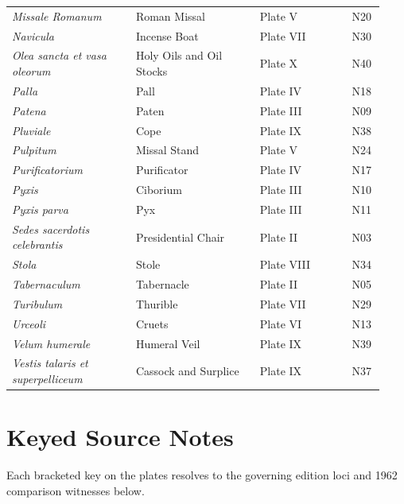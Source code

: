 {\begin{longtable}{>{\raggedright\arraybackslash}p{0.31\linewidth}>{\raggedright\arraybackslash}p{0.31\linewidth}>{\raggedright\arraybackslash}p{0.23\linewidth}>{\raggedright\arraybackslash}p{0.08\linewidth}}
\textit{Missale Romanum} & Roman Missal & Plate V & N20 \\
\textit{Navicula} & Incense Boat & Plate VII & N30 \\
\textit{Olea sancta et vasa oleorum} & Holy Oils and Oil Stocks & Plate X & N40 \\
\textit{Palla} & Pall & Plate IV & N18 \\
\textit{Patena} & Paten & Plate III & N09 \\
\textit{Pluviale} & Cope & Plate IX & N38 \\
\textit{Pulpitum} & Missal Stand & Plate V & N24 \\
\textit{Purificatorium} & Purificator & Plate IV & N17 \\
\textit{Pyxis} & Ciborium & Plate III & N10 \\
\textit{Pyxis parva} & Pyx & Plate III & N11 \\
\textit{Sedes sacerdotis celebrantis} & Presidential Chair & Plate II & N03 \\
\textit{Stola} & Stole & Plate VIII & N34 \\
\textit{Tabernaculum} & Tabernacle & Plate II & N05 \\
\textit{Turibulum} & Thurible & Plate VII & N29 \\
\textit{Urceoli} & Cruets & Plate VI & N13 \\
\textit{Velum humerale} & Humeral Veil & Plate IX & N39 \\
\textit{Vestis talaris et superpelliceum} & Cassock and Surplice & Plate IX & N37 \\
\bottomrule
\end{longtable}}

\clearpage
\section{Keyed Source Notes}
Each bracketed key on the plates resolves to the governing edition loci and 1962 comparison witnesses below.


